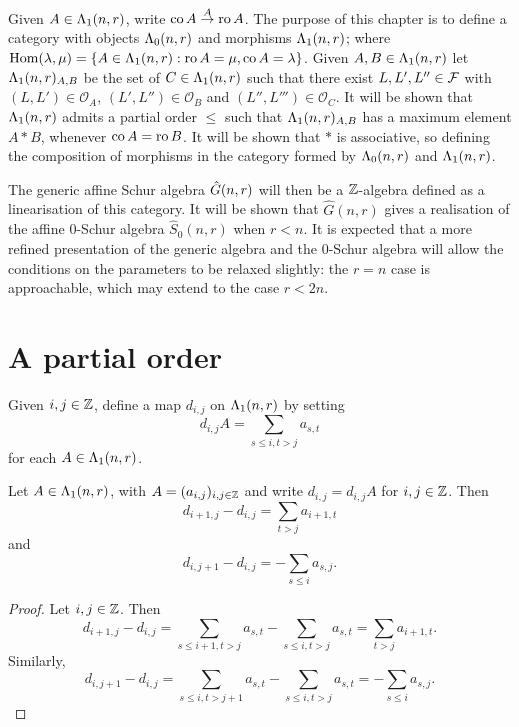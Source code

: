 \documentclass[a4paper, 11pt]{report}
\begin{document}
Given $A\in\Lambda_1(n,r)$, write $\operatorname{co}{A}\stackrel{A}{\to}\operatorname{ro}{A}$. The purpose of this chapter is to define a category with objects $\Lambda_0(n,r)$ and morphisms $\Lambda_1(n,r)$; where $\operatorname{Hom}(\lambda,\mu) = \{A\in\Lambda_1(n,r): \operatorname{ro}{A}=\mu,\operatorname{co}{A}=\lambda\}$. Given $A,B\in\Lambda_1(n,r)$ let $\Lambda_1(n,r)_{A,B}$ be the set of $C\in\Lambda_1(n,r)$ such that there exist $L,L',L''\in\mathcal{F}$ with $(L,L')\in\mathcal{O}_A$, $(L',L'')\in\mathcal{O}_B$ and $(L'',L''')\in\mathcal{O}_C$. It will be shown that $\Lambda_1(n,r)$ admits a partial order $\le$ such that $\Lambda_1(n,r)_{A,B}$ has a maximum element $A\ast B$, whenever $\operatorname{co}{A} = \operatorname{ro}{B}$. It will be shown that $\ast$ is associative, so defining the composition of morphisms in the category formed by $\Lambda_0(n,r)$ and $\Lambda_1(n,r)$.

The generic affine Schur algebra $\hat{G}(n,r)$ will then be a $\mathbb{Z}$-algebra defined as a linearisation of this category. It will be shown that $\hat{G}(n,r)$ gives a realisation of the affine $0$-Schur algebra $\hat{S}_0(n,r)$ when $r<n$. It is expected that a more refined presentation of the generic algebra and the 0-Schur algebra will allow the conditions on the parameters to be relaxed slightly: the $r=n$ case is approachable, which may extend to the case $r<2n$.

\section{A partial order}

Given $i,j\in\mathbb{Z}$, define a map $d_{i,j}$ on $\Lambda_1(n,r)$ by setting
\begin{equation*}
d_{i,j}A = \sum_{s\le i,t>j} a_{s,t}
\end{equation*}
for each $A\in\Lambda_1(n,r)$.

\begin{lemma}\label{lemma:differentials}
Let $A\in\Lambda_1(n,r)$, with $A=(a_{i,j})_{i,j\in\mathbb{Z}}$ and write $d_{i,j} = d_{i,j}A$ for $i,j\in\mathbb{Z}$. Then
\begin{equation*}
d_{i+1,j} - d_{i,j} = \sum_{t>j}a_{i+1,t}
\end{equation*}
and
\begin{equation*}
d_{i,j+1}-d_{i,j} = - \sum_{s\le i}a_{s,j}.
\end{equation*}
\end{lemma}

\begin{proof}
Let $i,j\in\mathbb{Z}$. Then
\begin{equation*}
d_{i+1,j} - d_{i,j} = \sum_{s\le i+1,t>j}a_{s,t} - \sum_{s\le i,t>j}a_{s,t} = \sum_{t>j}a_{i+1,t}.
\end{equation*}
Similarly,
\begin{equation*}
d_{i,j+1}-d_{i,j} = \sum_{s\le i,t>j+1}a_{s,t} - \sum_{s\le i,t>j}a_{s,t} = -\sum_{s\le i}a_{s,j}.
\end{equation*}
\end{proof}
\end{document}
